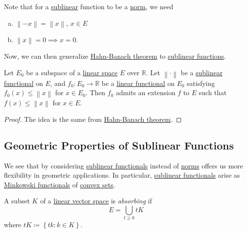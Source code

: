 \begin{remark}
	Note that for a \hyperref[def:sublinear]{sublinear} function to be a \hyperref[def:norm]{norm}, we need
	\begin{enumerate}[(a)]
		\item \(\left\lVert -x\right\rVert =\left\lVert x\right\rVert \), \(x\in E\)
		\item \(\left\lVert x\right\rVert = 0 \implies x = 0\).
	\end{enumerate}
\end{remark}

Now, we can then generalize \hyperref[thm:Hahn-Banach]{Hahn-Banach theorem} to \hyperref[def:sublinear]{sublinear functions}.

\begin{theorem}\label{thm:hahn-Banach-Sublinear}
	Let \(E_0\) be a subspace of a \hyperref[def:linear-vector-space]{linear space} \(E\) over \(\mathbb{R} \). Let \(\left\lVert \cdot\right\rVert \) be a \hyperref[def:sublinear]{sublinear functional} on \(E\), and \(f_0 \colon E_0\to \mathbb{R} \) be a \hyperref[def:linear-functional]{linear functional} on \(E_0\) satisfying \(f_0(x) \leq \left\lVert x\right\rVert \) for \(x\in E_0\). Then \(f_0\) admits an extension \(f\) to \(E\) such that \(f(x) \leq \left\lVert x\right\rVert \) for \(x\in E\).
\end{theorem}
\begin{proof}
	The idea is the same from \hyperref[thm:Hahn-Banach]{Hahn-Banach theorem}.
\end{proof}

\subsection{Geometric Properties of Sublinear Functions}
We see that by considering \hyperref[def:sublinear]{sublinear functionals} instead of \hyperref[def:norm]{norms} offers us more flexibility in geometric applications. In particular, \hyperref[def:sublinear]{sublinear functionals} arise as \hyperref[def:Minkowski-functional]{Minkowski functionals} of \hyperref[def:convex-set]{convex sets}.
\begin{definition}[Absorbing]\label{def:absorbing}
	A subset \(K\) of a \hyperref[def:linear-vector-space]{linear vector space} is \emph{absorbing} if
	\[
		E = \bigcup\limits_{t \geq 0} tK
	\]
	where \(tK \coloneqq \left\{ tk \colon k\in K \right\} \).
\end{definition}

